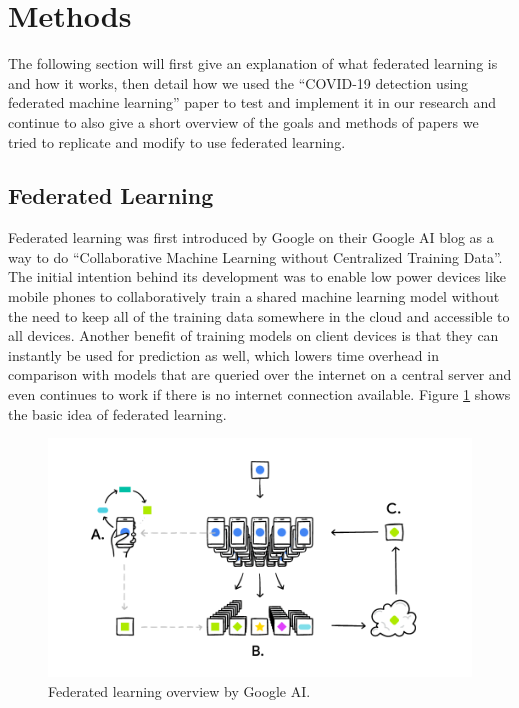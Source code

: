\section{Methods}

The following section will first give an explanation of what federated learning is and how it works, then detail how we used the \enquote{COVID-19 detection using federated machine learning} paper\cite{federated_machine_learning} to test and implement it in our research and continue to also give a short overview of the goals and methods of papers we tried to replicate and modify to use federated learning. 

\newpage
\subsection{Federated Learning}\label{subsec:methods_federated_learning}
Federated learning was first introduced by Google on their Google AI blog as a way to do \enquote{Collaborative Machine Learning without Centralized Training Data}\cite{google_ai_federated_learning}. The initial intention behind its development was to enable low power devices like mobile phones to collaboratively train a shared machine learning model without the need to keep all of the training data somewhere in the cloud and accessible to all devices. Another benefit of training models on client devices is that they can instantly be used for prediction as well, which lowers time overhead in comparison with models that are queried over the internet on a central server and even continues to work if there is no internet connection available.
Figure \ref{fig:google_ai_fl} shows the basic idea of federated learning. 

\begin{figure}[htbp]
    \centering
    \includegraphics[width=1.0\linewidth]{imgs/FederatedLearning_googleai.png}
    \caption{Federated learning overview by Google AI.\cite{google_ai_federated_learning}}
    \label{fig:google_ai_fl}
\end{figure}

